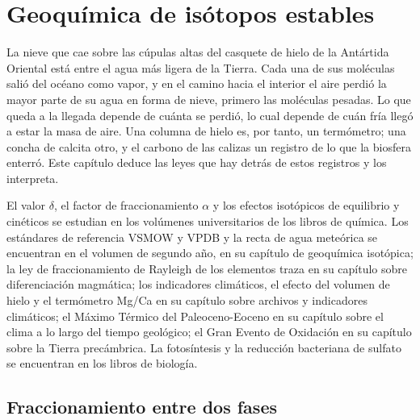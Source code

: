 \chapter{Geoquímica de isótopos estables}\label{ch:b3:stable-isotopes}

La nieve que cae sobre las cúpulas altas del casquete de hielo de la Antártida Oriental está entre el
agua más ligera de la Tierra. Cada una de sus moléculas salió del océano como vapor, y
en el camino hacia el interior el aire perdió la mayor parte de su agua en forma de nieve, primero las moléculas pesadas.
Lo que queda a la llegada depende de cuánta se perdió, lo cual depende de
cuán fría llegó a estar la masa de aire. Una columna de hielo es, por tanto, un termómetro; una concha
de calcita otro, y el carbono de las calizas un registro de lo que la
biosfera enterró. Este capítulo deduce las leyes que hay detrás de estos registros y
los interpreta.

\begin{recall}
El valor $\delta$, el factor de fraccionamiento $\alpha$ y los efectos isotópicos de equilibrio y
cinéticos se estudian en los volúmenes universitarios de los libros de química. Los
estándares de referencia VSMOW y VPDB y la recta de agua meteórica se encuentran en el
volumen de segundo año, en su capítulo de geoquímica isotópica; la ley de
fraccionamiento de Rayleigh de los elementos traza en su capítulo sobre diferenciación magmática;
los indicadores climáticos, el efecto del volumen de hielo y el termómetro Mg/Ca
en su capítulo sobre archivos y indicadores climáticos; el
Máximo Térmico del Paleoceno-Eoceno en su capítulo sobre el clima a lo largo del
tiempo geológico; el Gran Evento de Oxidación en su capítulo sobre la Tierra precámbrica.
La fotosíntesis y la reducción bacteriana de sulfato se encuentran en los libros de biología.
\end{recall}

\section{Fraccionamiento entre dos fases}\label{sec:b3:stable-isotopes:fractionation}

